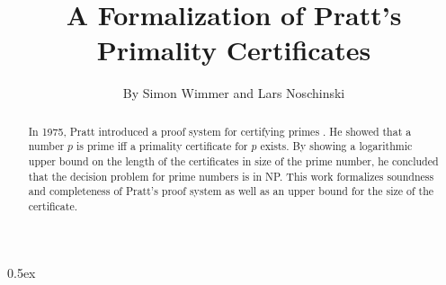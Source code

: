 \documentclass[11pt,a4paper]{article}
\begin{document}
\title{A Formalization of Pratt's Primality Certificates}
\author{By Simon Wimmer and Lars Noschinski}
\maketitle

\begin{abstract}
  In 1975, Pratt introduced a proof system for certifying primes
  \cite{pratt1975certificate}.  He showed that a number $p$ is prime iff a
  primality certificate for $p$ exists.  By showing a logarithmic upper bound
  on the length of the certificates in size of the prime number, he concluded
  that the decision problem for prime numbers is in NP.  This work formalizes
  soundness and completeness of Pratt's proof system as well as an
  upper bound for the size of the certificate.
\end{abstract}

\tableofcontents

\parindent 0pt\parskip 0.5ex



\nocite{*}



\end{document}
